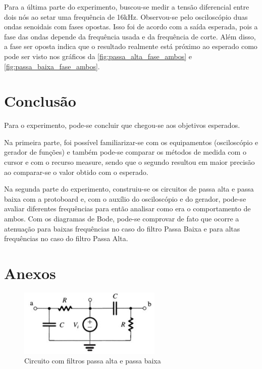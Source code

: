 \documentclass{article}
\begin{document}
Para a última parte do experimento, buscou-se medir a tensão diferencial entre dois nós ao setar uma frequência de 16kHz. Observou-se pelo osciloscópio duas ondas senoidais com fases opostas. Isso foi de acordo com a saída esperada, pois a fase das ondas depende da frequência usada e da frequência de corte. Além disso, a fase ser oposta indica que o resultado realmente está próximo ao esperado como pode ser visto nos gráficos da \ref{fig:passa_alta_fase_ambos} e \ref{fig:passa_baixa_fase_ambos}.

\section{Conclusão}
Para o experimento, pode-se concluir que chegou-se aos objetivos esperados.

Na primeira parte, foi possível familiarizar-se com os equipamentos (osciloscópio e gerador de funções) e também pode-se comparar os métodos de medida com o cursor e com o recurso measure, sendo que o segundo resultou em maior precisão ao comparar-se o valor obtido com o esperado.

Na segunda parte do experimento, construiu-se os circuitos de passa alta e passa baixa com a protoboard e, com o auxílio do osciloscópio e do gerador, pode-se avaliar diferentes frequências para então analisar como era o comportamento de ambos.
Com os diagramas de Bode, pode-se comprovar de fato que ocorre a atenuação para baixas frequências no caso do filtro Passa Baixa e para altas frequências no caso do filtro Passa Alta.

\nocite{*}



\newpage
\section*{Anexos}

\begin{figure}[h!]
\centering
\includegraphics[height=3.2cm]{images/montagem.png}
\caption{Circuito com filtros passa alta e passa baixa}
\label{fig:montagem}
\end{figure}
\end{document}
